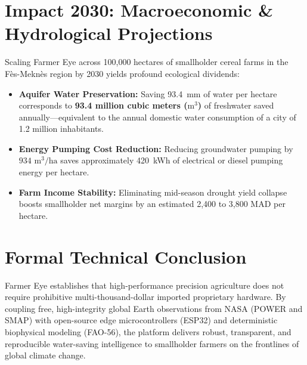 \documentclass[11pt,a4paper,oneside]{report}
\begin{document}
\section{Impact 2030: Macroeconomic & Hydrological Projections}
Scaling Farmer Eye across 100,000 hectares of smallholder cereal farms in the Fès-Meknès region by 2030 yields profound ecological dividends:
\begin{itemize}[leftmargin=*]
    \item \textbf{Aquifer Water Preservation:} Saving 93.4~mm of water per hectare corresponds to \textbf{93.4 million cubic meters ($\text{m}^3$)} of freshwater saved annually—equivalent to the annual domestic water consumption of a city of 1.2 million inhabitants.
    \item \textbf{Energy Pumping Cost Reduction:} Reducing groundwater pumping by $934\text{ m}^3/\text{ha}$ saves approximately 420~kWh of electrical or diesel pumping energy per hectare.
    \item \textbf{Farm Income Stability:} Eliminating mid-season drought yield collapse boosts smallholder net margins by an estimated 2,400 to 3,800 MAD per hectare.
\end{itemize}

\section{Formal Technical Conclusion}
Farmer Eye establishes that high-performance precision agriculture does not require prohibitive multi-thousand-dollar imported proprietary hardware. By coupling free, high-integrity global Earth observations from NASA (POWER and SMAP) with open-source edge microcontrollers (ESP32) and deterministic biophysical modeling (FAO-56), the platform delivers robust, transparent, and reproducible water-saving intelligence to smallholder farmers on the frontlines of global climate change.
\end{document}
